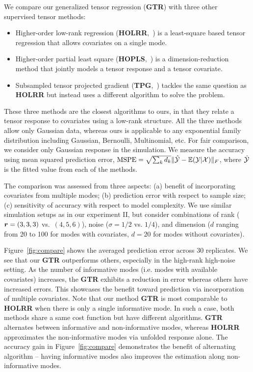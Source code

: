 \documentclass[12pt]{article}
\theoremstyle{plain}
\theoremstyle{definition}
\begin{document}
We compare our generalized tensor regression ({\bf GTR}) with three other supervised tensor methods:
\begin{itemize}
\item  Higher-order low-rank regression ({\bf HOLRR},~\citep{rabusseau2016low}) is a least-square based tensor regression that allows covariates on a single mode. 
\item Higher-order partial least square ({\bf HOPLS},~\citep{zhao2012higher}) is a dimension-reduction method that jointly models a tensor response and a tensor covariate. 
\item Subsampled tensor projected gradient ({\bf TPG},~\citep{yu2016learning}) tackles the same question as {\bf HOLRR} but instead uses a different algorithm to solve the problem. 
\end{itemize}
These three methods are the closest algorithms to ours, in that they relate a tensor response to covariates using a low-rank structure. All the three methods allow only Gaussian data, whereas ours is applicable to any exponential family distribution including Gaussian, Bernoulli, Multinomial, etc. For fair comparison, we consider only Gaussian response in the simulation. We measure the accuracy using mean squared prediction error, $\text{MSPE}=\sqrt{\sum_kd_k}\lVert\hat {\mathcal{Y}}-\mathbb{E}(\mathcal{Y}|\mathcal{X})\rVert_F$, where $\hat {\mathcal{Y}}$ is the fitted value from each of the methods. 

The comparison was assessed from three aspects: (a) benefit of incorporating covariates from multiple modes; (b) prediction error with respect to sample size; (c) sensitivity of accuracy with respect to model complexity. We use similar simulation setups as in our experiment II, but consider combinations of rank ($\bm{r}=(3,3,3)$ vs.\ $(4,5,6)$), noise ($\sigma = 1/2$ vs. $1/4$), and dimension ($d$ ranging from 20 to 100 for modes with covariates, $d = 20$ for modes without covariates). 

Figure~\ref{fig:compare} shows the averaged prediction error across 30 replicates. We see that our {\bf GTR} outperforms others, especially in the high-rank high-noise setting. As the number of informative modes (i.e. modes with available covariates) increases, the {\bf GTR} exhibits a reduction in error whereas others have increased errors. This showcases the benefit toward prediction via incorporation of multiple covariates. Note that our method {\bf GTR} is most comparable to {\bf HOLRR} when there is only a single informative mode. In such a case, both methods share a same cost function but have different algorithms. {\bf GTR} alternates between informative and non-informative modes, whereas {\bf HOLRR} approximates the non-informative modes via unfolded response alone. The accuracy gain in Figure~\ref{fig:compare} demonstrates the benefit of alternating algorithm -- having informative modes also improves the estimation along non-informative modes. 
\end{document}
